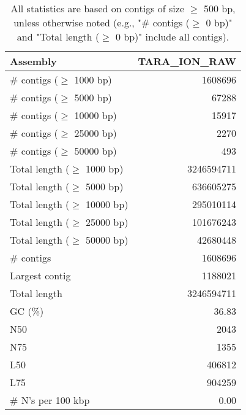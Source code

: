 \documentclass[12pt,a4paper]{article}
\begin{document}
\begin{table}[ht]
\begin{center}
\caption{All statistics are based on contigs of size $\geq$ 500 bp, unless otherwise noted (e.g., "\# contigs ($\geq$ 0 bp)" and "Total length ($\geq$ 0 bp)" include all contigs).}
\begin{tabular}{|l*{1}{|r}|}
\hline
Assembly & TARA\_ION\_RAW \\ \hline
\# contigs ($\geq$ 1000 bp) & 1608696 \\ \hline
\# contigs ($\geq$ 5000 bp) & 67288 \\ \hline
\# contigs ($\geq$ 10000 bp) & 15917 \\ \hline
\# contigs ($\geq$ 25000 bp) & 2270 \\ \hline
\# contigs ($\geq$ 50000 bp) & 493 \\ \hline
Total length ($\geq$ 1000 bp) & 3246594711 \\ \hline
Total length ($\geq$ 5000 bp) & 636605275 \\ \hline
Total length ($\geq$ 10000 bp) & 295010114 \\ \hline
Total length ($\geq$ 25000 bp) & 101676243 \\ \hline
Total length ($\geq$ 50000 bp) & 42680448 \\ \hline
\# contigs & 1608696 \\ \hline
Largest contig & 1188021 \\ \hline
Total length & 3246594711 \\ \hline
GC (\%) & 36.83 \\ \hline
N50 & 2043 \\ \hline
N75 & 1355 \\ \hline
L50 & 406812 \\ \hline
L75 & 904259 \\ \hline
\# N's per 100 kbp & 0.00 \\ \hline
\end{tabular}
\end{center}
\end{table}
\end{document}
